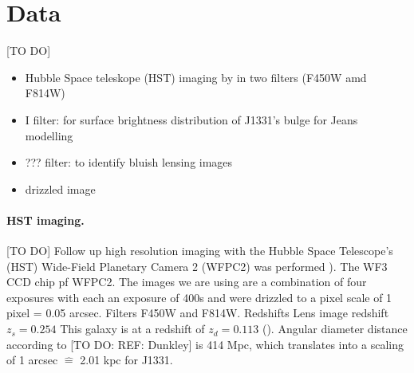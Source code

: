 \section{Data} \label{sec:data}

[TO DO]

\begin{itemize}
\item Hubble Space teleskope (HST) imaging by \cite{SWELLSI} in two filters (F450W amd F814W)
\item I filter: for surface brightness distribution of J1331's bulge for Jeans modelling
\item ??? filter: to identify bluish lensing images
\item drizzled image
\end{itemize}

\paragraph{HST imaging.} [TO DO] Follow up high resolution imaging with the Hubble Space Telescope's (HST) Wide-Field Planetary Camera 2 (WFPC2) was performed \citep{SWELLSI}). The WF3 CCD chip pf WFPC2. The images we are using are a combination of four exposures with each an exposure of 400s and were drizzled to a pixel scale of 1 pixel = 0.05 arcsec. Filters F450W and F814W. Redshifts Lens image redshift $z_s = 0.254$  \citep{SWELLSIII} This galaxy is at a redshift of $z_d = 0.113$ (\cite{SWELLSIII}). Angular diameter distance according to [TO DO: REF: Dunkley] is 414 Mpc, which translates into a scaling of 1 arcsec $\hat{=}$ 2.01 kpc for J1331.


